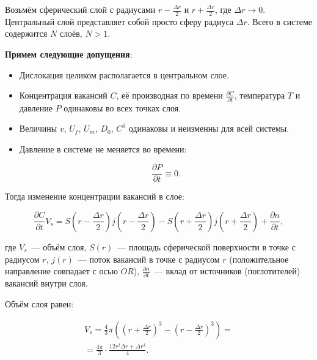 \documentclass[12pt, a4paper]{article}
\begin{document}
Возьмём сферический слой с радиусами $r-\frac{\Delta r}{2}$ и $r + \frac{\Delta r}{2}$, где $\Delta r \to 0$. Центральный слой представляет собой просто сферу радиуса $\Delta r$. Всего в системе содержится $N$ слоёв, $N > 1$.

{\bf Примем следующие допущения}:

\begin{itemize}
\item Дислокация целиком располагается в центральном слое.
\item Концентрация вакансий $C$, её производная по времени $\frac{\partial C}{\partial t}$, температура $T$ и давление $P$ одинаковы во всех точках слоя.
\item Величины $v$, $U_f$, $U_m$, $D_0$, $C^0$ одинаковы и неизменны для всей системы.
\item Давление в системе не меняется во времени:

\begin{equation}
\label{eq_dp_dt}
\frac{\partial P}{\partial t} \equiv 0.
\end{equation}

\end{itemize}
 
 Тогда изменение концентрации вакансий в слое:

\begin{equation}
\label{eq_dc_dt}
\frac{\partial C}{\partial t} V_s = S\left(r-\frac{\Delta r}{2}\right) j\left(r-\frac{\Delta r}{2}\right)-S\left(r+\frac{\Delta r}{2}\right) j\left(r+\frac{\Delta r}{2}\right) + \frac{\partial n}{\partial t},
\end{equation}

\noindent где $V_s$~--- объём слоя, $S(r)$~--- площадь сферической поверхности в точке с радиусом $r$, $j(r)$~--- поток вакансий в точке с радиусом $r$ (положительное направление совпадает с осью $OR$), $\frac{\partial n}{\partial t}$~--- вклад от источников (поглотителей) вакансий внутри слоя.

Объём слоя равен:

\begin{equation}
\label{eq_v_s}
\begin{aligned}
V_s=\frac{4}{3}\pi\left( \left( r + \frac{\Delta r}{2} \right) ^3 - \left( r - \frac{\Delta r}{2} \right)^3 \right) = \\
= \frac{4\pi}{3} \cdot \frac{12 r^2 \Delta r + \Delta r ^3}{4}. \\
\end{aligned}
\end{equation}
\end{document}
